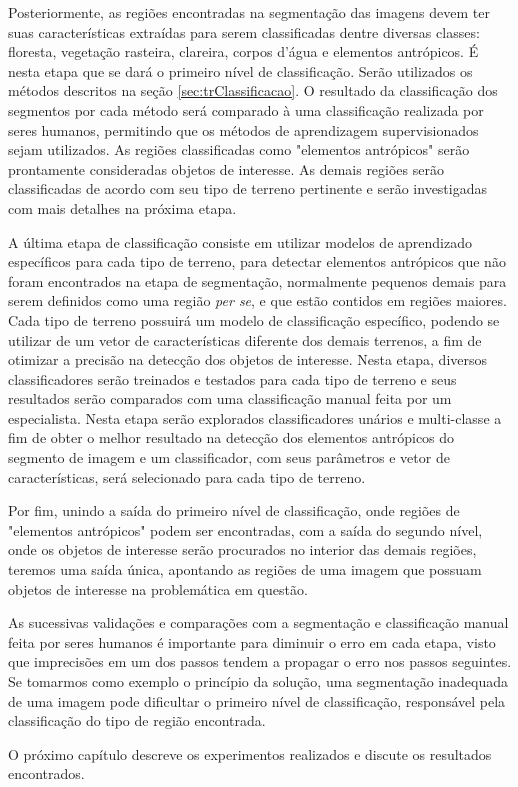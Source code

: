 Posteriormente, as regiões encontradas na segmentação das imagens devem ter suas características extraídas para serem classificadas dentre diversas classes: floresta, vegetação rasteira, clareira, corpos d'água e elementos antrópicos. É nesta etapa que se dará o primeiro nível de classificação. Serão utilizados os métodos descritos na seção \ref{sec:trClassificacao}. O resultado da classificação dos segmentos por cada método será comparado à uma classificação realizada por seres humanos, permitindo que os métodos de aprendizagem supervisionados sejam utilizados. As regiões classificadas como "elementos antrópicos" serão prontamente consideradas objetos de interesse. As demais regiões serão classificadas de acordo com seu tipo de terreno pertinente e serão investigadas com mais detalhes na próxima etapa.

A última etapa de classificação consiste em utilizar modelos de aprendizado específicos para cada tipo de terreno, para detectar elementos antrópicos que não foram encontrados na etapa de segmentação, normalmente pequenos demais para serem definidos como uma região \textit{per se}, e que estão contidos em regiões maiores. Cada tipo de terreno possuirá um modelo de classificação específico, podendo se utilizar de um vetor de características diferente dos demais terrenos, a fim de otimizar a precisão na detecção dos objetos de interesse. Nesta etapa, diversos classificadores serão treinados e testados para cada tipo de terreno e seus resultados serão comparados com uma classificação manual feita por um especialista. Nesta etapa serão explorados classificadores unários e multi-classe a fim de obter o melhor resultado na detecção dos elementos antrópicos do segmento de imagem e um classificador, com seus parâmetros e vetor de características, será selecionado para cada tipo de terreno.

Por fim, unindo a saída do primeiro nível de classificação, onde regiões de "elementos antrópicos" podem ser encontradas, com a saída do segundo nível, onde os objetos de interesse serão procurados no interior das demais regiões, teremos uma saída única, apontando as regiões de uma imagem que possuam objetos de interesse na problemática em questão.

As sucessivas validações e comparações com a segmentação e classificação manual feita por seres humanos é importante para diminuir o erro em cada etapa, visto que imprecisões em um dos passos tendem a propagar o erro nos passos seguintes. Se tomarmos como exemplo o princípio da solução, uma segmentação inadequada de uma imagem pode dificultar o primeiro nível de classificação, responsável pela classificação do tipo de região encontrada.


O próximo capítulo descreve os experimentos realizados e discute os resultados encontrados.